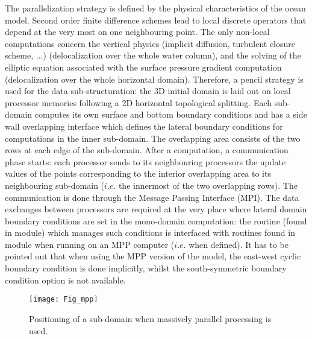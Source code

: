 \documentclass[../tex_main/NEMO_manual]{subfiles}
\begin{document}
The parallelization strategy is defined by the physical characteristics of the ocean model.
Second order finite difference schemes lead to local discrete operators that
depend at the very most on one neighbouring point.
The only non-local computations concern the vertical physics
(implicit diffusion, turbulent closure scheme, ...) (delocalization over the whole water column),
and the solving of the elliptic equation associated with the surface pressure gradient computation
(delocalization over the whole horizontal domain).
Therefore, a pencil strategy is used for the data sub-structuration:
the 3D initial domain is laid out on local processor memories following a 2D horizontal topological splitting.
Each sub-domain computes its own surface and bottom boundary conditions and
has a side wall overlapping interface which defines the lateral boundary conditions for
computations in the inner sub-domain.
The overlapping area consists of the two rows at each edge of the sub-domain.
After a computation, a communication phase starts:
each processor sends to its neighbouring processors the update values of the points corresponding to
the interior overlapping area to its neighbouring sub-domain ($i.e.$ the innermost of the two overlapping rows).
The communication is done through the Message Passing Interface (MPI).
The data exchanges between processors are required at the very place where
lateral domain boundary conditions are set in the mono-domain computation:
the  routine (found in  module) which manages such conditions is interfaced with
routines found in  module when running on an MPP computer ($i.e.$ when  defined).
It has to be pointed out that when using the MPP version of the model,
the east-west cyclic boundary condition is done implicitly,
whilst the south-symmetric boundary condition option is not available.

\begin{figure}[!t]    \begin{center}
\texttt{[image: Fig\_mpp]}
\caption{   \protect\label{fig:mpp}
  Positioning of a sub-domain when massively parallel processing is used. }
\end{center}   \end{figure}
\end{document}
